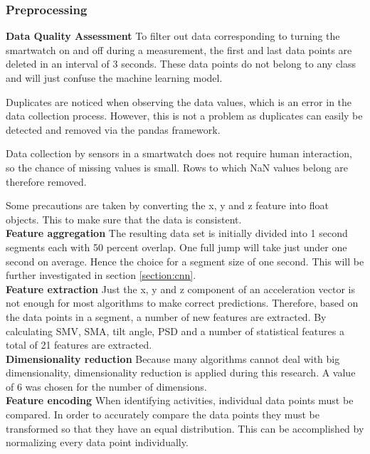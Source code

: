 \documentclass[twocolumn]{phdsymp} %
\begin{document}
\subsubsection{Preprocessing}
\noindent\textbf{Data Quality Assessment}\newline
To filter out data corresponding to turning the smartwatch on and off during a measurement, the first and last data points are deleted in an interval of 3 seconds. These data points do not belong to any class and will just confuse the machine learning model.

Duplicates are noticed when observing the data values, which is an error in the data collection process. However, this is not a problem as duplicates can easily be detected and removed via the pandas framework.

Data collection by sensors in a smartwatch does not require human interaction, so the chance of missing values is small. Rows to which NaN values belong are therefore removed.

Some precautions are taken by converting the x, y and z feature into float objects. This to make sure that the data is consistent. \\

\noindent\textbf{Feature aggregation}\newline
The resulting data set is initially divided into 1 second segments each with 50 percent overlap. One full jump will take just under one second on average. Hence the choice for a segment size of one second. This will be further investigated in section \ref{section:cnn}. \\

\noindent\textbf{Feature extraction}\newline
Just the x, y and z component of an acceleration vector is not enough for most algorithms to make correct predictions. Therefore, based on the data points in a segment, a number of new features are extracted. By calculating SMV, SMA, tilt angle, PSD and a number of statistical features a total of 21 features are extracted. \\

\noindent\textbf{Dimensionality reduction}\newline
Because many algorithms cannot deal with big dimensionality, dimensionality reduction is applied during this research. A value of 6 was chosen for the number of dimensions. \\

\noindent\textbf{Feature encoding}\newline
When identifying activities, individual data points must be compared. In order to accurately compare the data points they must be transformed so that they have an equal distribution. This can be accomplished by normalizing every data point individually.
\end{document}
